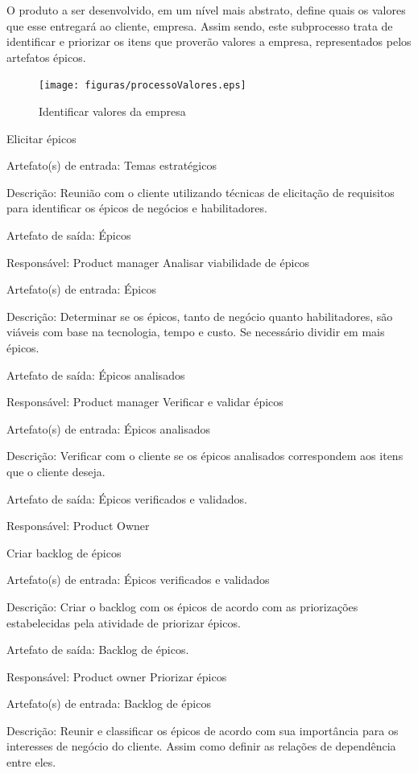 O produto a ser desenvolvido, em um nível mais abstrato, define quais os valores que esse entregará ao cliente, empresa. Assim sendo, este subprocesso trata de identificar e priorizar os itens que proverão valores a empresa, representados pelos artefatos épicos.

\begin{figure}[H]
    \centering
    \caption{Identificar valores da empresa}
    \label{processoValores}
    \texttt{[image: figuras/processoValores.eps]}
\end{figure}

Elicitar épicos

Artefato(s) de entrada: Temas estratégicos

Descrição: Reunião com o cliente utilizando técnicas de elicitação de requisitos para identificar os épicos de negócios e habilitadores.

Artefato de saída: Épicos

Responsável: Product manager
Analisar viabilidade de épicos

Artefato(s) de entrada: Épicos

Descrição: Determinar se os épicos, tanto de negócio quanto habilitadores, são viáveis com base na tecnologia, tempo e custo. Se necessário dividir em mais épicos.

Artefato de saída: Épicos analisados

Responsável: Product manager
Verificar e validar épicos

Artefato(s) de entrada: Épicos analisados

Descrição: Verificar com o cliente se os épicos analisados correspondem aos itens que o cliente deseja.

Artefato de saída: Épicos verificados e validados.

Responsável: Product Owner

Criar backlog de épicos

Artefato(s) de entrada: Épicos verificados e validados

Descrição: Criar o backlog com os épicos de acordo com as priorizações estabelecidas pela atividade de priorizar épicos.

Artefato de saída: Backlog de épicos.

Responsável: Product owner
Priorizar épicos

Artefato(s) de entrada: Backlog de épicos

Descrição: Reunir e classificar os épicos de acordo com sua importância para os interesses de negócio do cliente. Assim como definir as relações de dependência entre eles.

